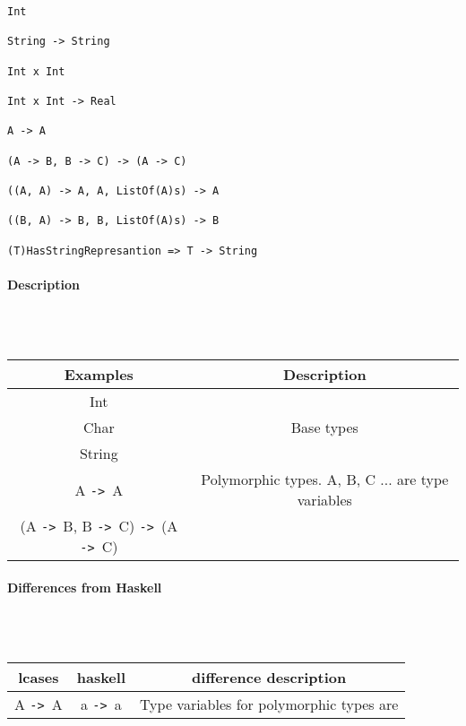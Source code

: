 \documentclass{article}
\def\ra{\texttt{->}\ }
\def\pend{\mbox{} \\\\}
\begin{document}
\begin{verbatim}
Int

String -> String 

Int x Int 

Int x Int -> Real

A -> A

(A -> B, B -> C) -> (A -> C)

((A, A) -> A, A, ListOf(A)s) -> A

((B, A) -> B, B, ListOf(A)s) -> B

(T)HasStringRepresantion => T -> String
\end{verbatim}

\paragraph{Description}\pend
\begin{tabular}{ |c|c| } 
\hline
Examples & Description \\ 
\hline
\hline
Int & \\
Char & Base types \\
String & \\ 
\hline
A \ra A &
Polymorphic types. A, B, C ... are type variables
\\
(A \ra B, B \ra C) \ra (A \ra C) &
\\ 
\hline
\end{tabular}

\paragraph{Differences from Haskell}\pend
\begin{tabular}{ |c|c|c| } 
\hline
lcases & haskell & difference description \\ 
\hline
\hline
A \ra A & a \ra a & Type variables for polymorphic types are  \\ 
\hline
\end{tabular}
\end{document}
